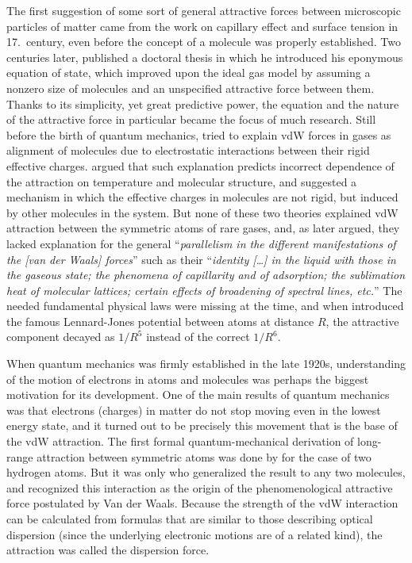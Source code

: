 The first suggestion of some sort of general attractive forces between microscopic particles of matter came from the work on capillary effect and surface tension in 17.\ century, even before the concept of a molecule was properly established.
Two centuries later, \citet{vanderWaals73} published a doctoral thesis in which he introduced his eponymous equation of state, which improved upon the ideal gas model by assuming a nonzero size of molecules and an unspecified attractive force between them.
Thanks to its simplicity, yet great predictive power, the equation and the nature of the attractive force in particular became the focus of much research.
Still before the birth of quantum mechanics, \citet{KeesomPK12a} tried to explain vdW forces in gases as alignment of molecules due to electrostatic interactions between their rigid effective charges.
\citet{DebyePZ20} argued that such explanation predicts incorrect dependence of the attraction on temperature and molecular structure, and suggested a mechanism in which the effective charges in molecules are not rigid, but induced by other molecules in the system.
But none of these two theories explained vdW attraction between the symmetric atoms of rare gases, and, as \citet{LondonTFS37} later argued, they lacked explanation for the general ``\emph{parallelism in the different manifestations of the \emph{[van der Waals]} forces}'' such as their ``\emph{identity \emph{[\ldots]} in the liquid with those in the gaseous state; the phenomena of capillarity and of adsorption; the sublimation heat of molecular lattices; certain effects of broadening of spectral lines, etc.}''
The needed fundamental physical laws were missing at the time, and when \citet{JonesPRSLA24} introduced the famous Lennard-Jones potential between atoms at distance $R$, the attractive component decayed as $1/R^5$ instead of the correct $1/R^6$.

When quantum mechanics was firmly established in the late 1920s, understanding of the motion of electrons in atoms and molecules was perhaps the biggest motivation for its development.
One of the main results of quantum mechanics was that electrons (charges) in matter do not stop moving even in the lowest energy state, and it turned out to be precisely this movement that is the base of the vdW attraction.
The first formal quantum-mechanical derivation of long-range attraction between symmetric atoms was done by \citet{WangPZ27} for the case of two hydrogen atoms.
But it was only \citet{LondonZP30} who generalized the result to any two molecules, and recognized this interaction as the origin of the phenomenological attractive force postulated by Van der Waals.
Because the strength of the vdW interaction can be calculated from formulas that are similar to those describing optical dispersion (since the underlying electronic motions are of a related kind), the attraction was called the dispersion force.
\citet{SlaterPR31}

